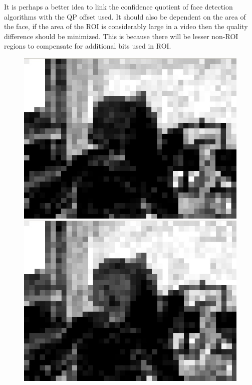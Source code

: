 \documentclass[11pt]{article} %
\begin{document}
It is perhaps a better idea to link the confidence quotient of face detection algorithms with the QP offset used. It should also be dependent on the area of the face, if the area of the ROI is considerably large in a video then the quality difference should be minimized. This is because there will be lesser non-ROI regions to compensate for additional bits used in ROI.
\begin{figure}[!h]
    \centering
    \includegraphics[scale=0.4]{PaulDefault120_91250kbps_psnr}
    \includegraphics[scale=0.4]{QPOffset/paul120_250kbps_QPoffset4_psnr}

\end{figure}
\end{document}

